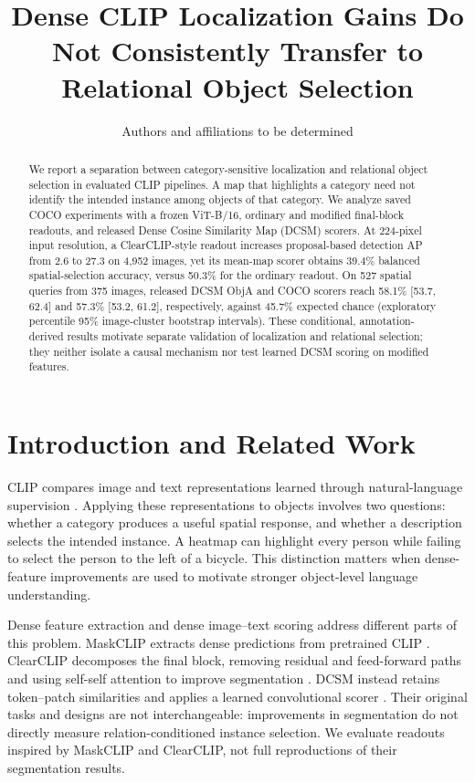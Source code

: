 \documentclass[10pt,twocolumn,letterpaper]{article}
\title{Dense CLIP Localization Gains Do Not Consistently Transfer to Relational Object Selection}
\author{Authors and affiliations to be determined}
\date{}
\begin{document}
\raggedbottom
\maketitle
\begin{abstract}
We report a separation between category-sensitive localization and
relational object selection in evaluated CLIP pipelines. A map that
highlights a category need not identify the intended instance among
objects of that category. We analyze saved COCO experiments with a
frozen ViT-B/16, ordinary and modified final-block readouts, and
released Dense Cosine Similarity Map (DCSM) scorers. At 224-pixel input
resolution, a ClearCLIP-style readout increases proposal-based detection
AP from 2.6 to 27.3 on 4,952 images, yet its mean-map scorer obtains
39.4\% balanced spatial-selection accuracy, versus 50.3\% for the
ordinary readout. On 527 spatial queries from 375 images, released DCSM
ObjA and COCO scorers reach 58.1\% {[}53.7, 62.4{]} and 57.3\% {[}53.2,
61.2{]}, respectively, against 45.7\% expected chance (exploratory
percentile 95\% image-cluster bootstrap intervals). These conditional,
annotation-derived results motivate separate validation of localization
and relational selection; they neither isolate a causal mechanism nor
test learned DCSM scoring on modified features.
\end{abstract}

\section{Introduction and Related
Work}\label{introduction-and-related-work}

CLIP compares image and text representations learned through
natural-language supervision \citep{radford2021clip}. Applying these
representations to objects involves two questions: whether a category
produces a useful spatial response, and whether a description selects
the intended instance. A heatmap can highlight every person while
failing to select the person to the left of a bicycle. This distinction
matters when dense-feature improvements are used to motivate stronger
object-level language understanding.

Dense feature extraction and dense image--text scoring address different
parts of this problem. MaskCLIP extracts dense predictions from
pretrained CLIP \citep{zhou2021maskclip}. ClearCLIP decomposes the final
block, removing residual and feed-forward paths and using self-self
attention to improve segmentation \citep{lan2024clearclip}. DCSM instead
retains token--patch similarities and applies a learned convolutional
scorer \citep{kang2025dcsm}. Their original tasks and designs are not
interchangeable: improvements in segmentation do not directly measure
relation-conditioned instance selection. We evaluate readouts inspired
by MaskCLIP and ClearCLIP, not full reproductions of their segmentation
results.
\end{document}
